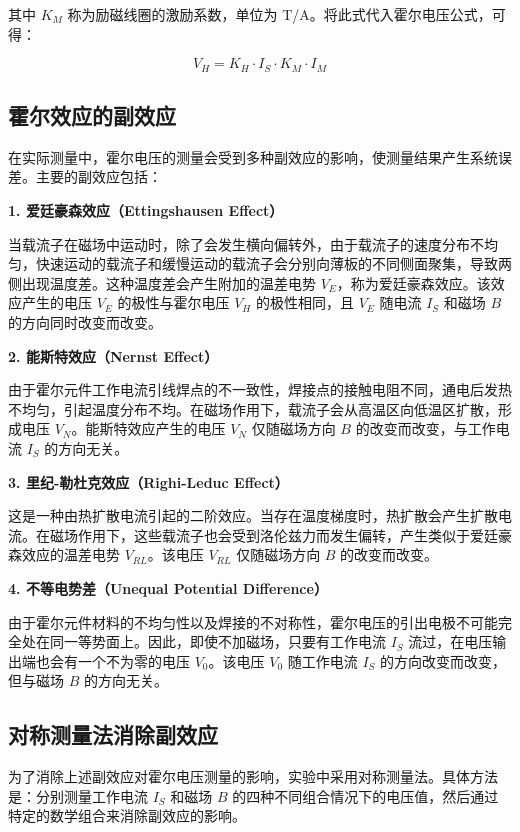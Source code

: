 ﻿\documentclass[12pt,a4paper]{article}
\begin{document}
其中 $K_M$ 称为励磁线圈的激励系数，单位为 T/A。将此式代入霍尔电压公式，可得：

\begin{equation}
V_H = K_H \cdot I_S \cdot K_M \cdot I_M
\end{equation}

\subsection{霍尔效应的副效应}

在实际测量中，霍尔电压的测量会受到多种副效应的影响，使测量结果产生系统误差。主要的副效应包括：

\textbf{1. 爱廷豪森效应（Ettingshausen Effect）}

当载流子在磁场中运动时，除了会发生横向偏转外，由于载流子的速度分布不均匀，快速运动的载流子和缓慢运动的载流子会分别向薄板的不同侧面聚集，导致两侧出现温度差。这种温度差会产生附加的温差电势 $V_E$，称为爱廷豪森效应。该效应产生的电压 $V_E$ 的极性与霍尔电压 $V_H$ 的极性相同，且 $V_E$ 随电流 $I_S$ 和磁场 $B$ 的方向同时改变而改变。

\textbf{2. 能斯特效应（Nernst Effect）}

由于霍尔元件工作电流引线焊点的不一致性，焊接点的接触电阻不同，通电后发热不均匀，引起温度分布不均。在磁场作用下，载流子会从高温区向低温区扩散，形成电压 $V_N$。能斯特效应产生的电压 $V_N$ 仅随磁场方向 $B$ 的改变而改变，与工作电流 $I_S$ 的方向无关。

\textbf{3. 里纪-勒杜克效应（Righi-Leduc Effect）}

这是一种由热扩散电流引起的二阶效应。当存在温度梯度时，热扩散会产生扩散电流。在磁场作用下，这些载流子也会受到洛伦兹力而发生偏转，产生类似于爱廷豪森效应的温差电势 $V_{RL}$。该电压 $V_{RL}$ 仅随磁场方向 $B$ 的改变而改变。

\textbf{4. 不等电势差（Unequal Potential Difference）}

由于霍尔元件材料的不均匀性以及焊接的不对称性，霍尔电压的引出电极不可能完全处在同一等势面上。因此，即使不加磁场，只要有工作电流 $I_S$ 流过，在电压输出端也会有一个不为零的电压 $V_0$。该电压 $V_0$ 随工作电流 $I_S$ 的方向改变而改变，但与磁场 $B$ 的方向无关。

\subsection{对称测量法消除副效应}

为了消除上述副效应对霍尔电压测量的影响，实验中采用对称测量法。具体方法是：分别测量工作电流 $I_S$ 和磁场 $B$ 的四种不同组合情况下的电压值，然后通过特定的数学组合来消除副效应的影响。
\end{document}
